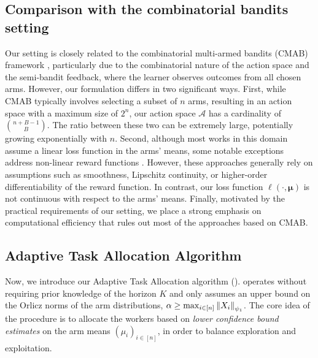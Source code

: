 \subsection{Comparison with the combinatorial bandits setting}
Our setting is closely related to the combinatorial multi-armed bandits (CMAB) framework \citep{cesa2012combinatorial}, particularly due to the combinatorial nature of the action space and the semi-bandit feedback, where the learner observes outcomes from all chosen arms.
However, our formulation differs in two significant ways.
First, while CMAB typically involves selecting a subset of $n$ arms, resulting in an action space with a maximum size of $2^n$, our action space $\mathcal{A}$ has a cardinality of $\binom{n + B - 1}{B}$.
The ratio between these two can be extremely large, potentially growing exponentially with $n$.
Second, although most works in this domain assume a linear loss function in the arms' means, some notable exceptions address non-linear reward functions \citep{chen2013combinatorial, lin2015stochastic, chen2016combinatorial, wang2018thompson}.
However, these approaches generally rely on assumptions such as smoothness, Lipschitz continuity, or higher-order differentiability of the reward function.
In contrast, our loss function $\ell(\cdot, \bm{\mu})$ is not continuous with respect to the arms' means.
Finally, motivated by the practical requirements of our setting, we place a strong emphasis on computational efficiency that rules out most of the approaches based on CMAB.

\subsection{Adaptive Task Allocation Algorithm}
Now, we introduce our Adaptive Task Allocation algorithm ().
 operates without requiring prior knowledge of the horizon $K$ and only assumes an upper bound on the Orlicz norms of the arm distributions, $\alpha \ge \max_{i \in [n]}{\left\| X_i \right\|_{\psi_1}}$.
The core idea of the procedure is to allocate the workers based on \emph{lower confidence bound estimates} on the arm means $(\mu_i)_{i \in [n]}$, in order to balance exploration and exploitation.

